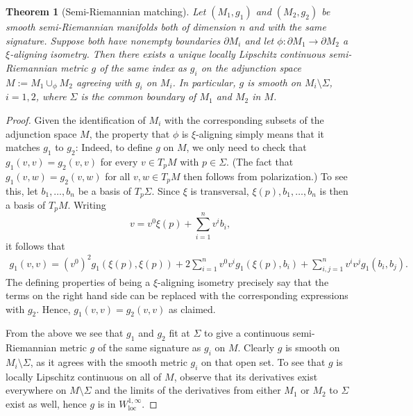 \documentclass[11pt]{article}
\numberwithin{equation}{section}
\newtheorem{theorem}{Theorem}[section]
\begin{document}
\begin{theorem}[Semi-Riemannian matching]\label{Theorem: abstractmatching}
Let $(M_1,g_1)$ and $(M_2,g_2)$ be smooth semi-Rie\-mannian manifolds both 
of dimension $n$ and with the same signature. Suppose both have nonempty boundaries $\partial M_i$ and let $\phi:\partial M_1 \to \partial M_2$ a $\xi$-aligning isometry. Then there exists a unique locally Lipschitz continuous semi-Riemannian metric $g$ of the same index as $g_i$ on the adjunction space $M:=M_1 \cup_\phi M_2$ agreeing with $g_i$ on $M_i$. In particular, $g$ is smooth on $M_i \setminus \Sigma$, $i=1,2$, where $\Sigma$ is the common boundary of $M_1$ and $M_2$ in $M$.
\end{theorem}
\begin{proof}
    Given the identification of $M_i$ with the corresponding subsets of the adjunction space $M$, the property that $\phi$ is $\xi$-aligning simply means that it matches $g_1$ to $g_2$: Indeed, to define $g$ on $M$, we only need to check that $g_1(v,v) = g_2(v,v)$ for every $v \in T_pM$ with $p \in \Sigma$. (The fact that $g_1(v,w) = g_2(v,w)$ for all $v,w \in T_pM$ then follows from polarization.) To see this, let $b_1,\dots, b_n$ be a basis of $T_p \Sigma$. Since $\xi$ is transversal, $\xi(p),b_1,\dots,b_n$ is then a basis of $T_pM$. Writing 
    \begin{equation}
        v = v^0 \xi(p) + \sum_{i=1}^n v^i b_i,
    \end{equation}
    it follows that
    \begin{align*}
        g_1(v,v) = (v^0)^2 g_1(\xi(p),\xi(p)) + 2\sum_{i=1}^n v^0 v^i g_1(\xi(p),b_i) + \sum_{i,j=1}^n v^i v^j g_1(b_i,b_j).
    \end{align*}
    The defining properties of being a $\xi$-aligning isometry precisely say that the terms on the right hand side can be replaced with the corresponding expressions with $g_2$. Hence, $g_1(v,v) = g_2(v,v)$ as claimed.

    From the above we see that $g_1$ and $g_2$ fit at $\Sigma$ to give a continuous semi-Riemannian metric $g$ of the same signature as $g_i$ on $M$. Clearly $g$ is smooth on $M_i \setminus \Sigma$, as it agrees with the smooth metric $g_i$ on that open set. To see that $g$ is locally Lipschitz continuous on all of $M$, observe that its derivatives exist everywhere on $M \setminus \Sigma$ and the limits of the derivatives from either $M_1$ or $M_2$ to $\Sigma$ exist as well, hence $g$ is in $W^{1,\infty}_{\mathrm{loc}}$.
\end{proof}
\end{document}
